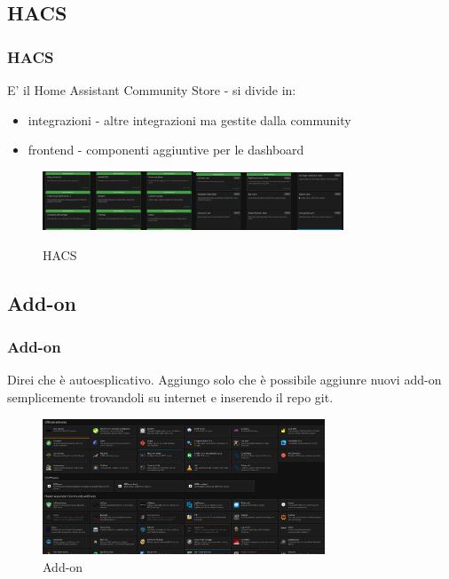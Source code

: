 \documentclass[hyperref={pdfpagelabels=false}]{beamer}
\begin{document}
	\subsection{HACS}
	\begin{frame}
	\frametitle{HACS}
	\normalsize E' il Home Assistant Community Store - si divide in:
	\begin{itemize}
		\item integrazioni - altre integrazioni ma gestite dalla community
		\item frontend - componenti aggiuntive per le dashboard
	\end{itemize}
	\begin{figure}
		\centering
		\includegraphics[width=0.4\textwidth]{./images/hacs-integrations.png}\quad\includegraphics[width=0.4\textwidth]{./images/hacs-frontend.png}
		\caption{HACS}
		\label{fig:hacs-integration}
	\end{figure}
	\end{frame}

	\subsection{Add-on}
	\begin{frame}
	\frametitle{Add-on}
	\normalsize Direi che è autoesplicativo. Aggiungo solo che è possibile aggiunre nuovi add-on semplicemente trovandoli su internet e inserendo il repo git.
	\begin{figure}
		\centering
		\includegraphics[width=0.75\textwidth]{./images/add-on.png}
		\caption{Add-on}
		\label{fig:add-on}
	\end{figure}
	\end{frame}
\end{document}
